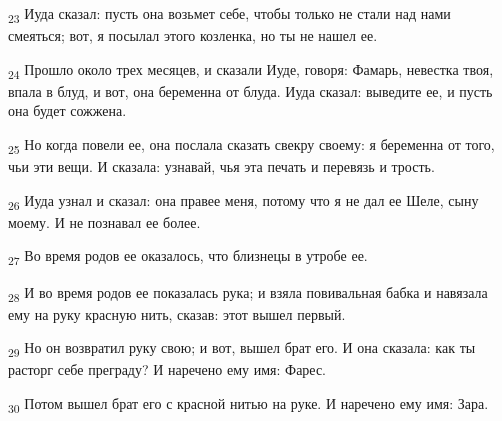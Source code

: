 \begin{tcolorbox}
\textsubscript{23} Иуда сказал: пусть она возьмет себе, чтобы только не стали над нами смеяться; вот, я посылал этого козленка, но ты не нашел ее.
\end{tcolorbox}
\begin{tcolorbox}
\textsubscript{24} Прошло около трех месяцев, и сказали Иуде, говоря: Фамарь, невестка твоя, впала в блуд, и вот, она беременна от блуда. Иуда сказал: выведите ее, и пусть она будет сожжена.
\end{tcolorbox}
\begin{tcolorbox}
\textsubscript{25} Но когда повели ее, она послала сказать свекру своему: я беременна от того, чьи эти вещи. И сказала: узнавай, чья эта печать и перевязь и трость.
\end{tcolorbox}
\begin{tcolorbox}
\textsubscript{26} Иуда узнал и сказал: она правее меня, потому что я не дал ее Шеле, сыну моему. И не познавал ее более.
\end{tcolorbox}
\begin{tcolorbox}
\textsubscript{27} Во время родов ее оказалось, что близнецы в утробе ее.
\end{tcolorbox}
\begin{tcolorbox}
\textsubscript{28} И во время родов ее показалась рука; и взяла повивальная бабка и навязала ему на руку красную нить, сказав: этот вышел первый.
\end{tcolorbox}
\begin{tcolorbox}
\textsubscript{29} Но он возвратил руку свою; и вот, вышел брат его. И она сказала: как ты расторг себе преграду? И наречено ему имя: Фарес.
\end{tcolorbox}
\begin{tcolorbox}
\textsubscript{30} Потом вышел брат его с красной нитью на руке. И наречено ему имя: Зара.
\end{tcolorbox}
